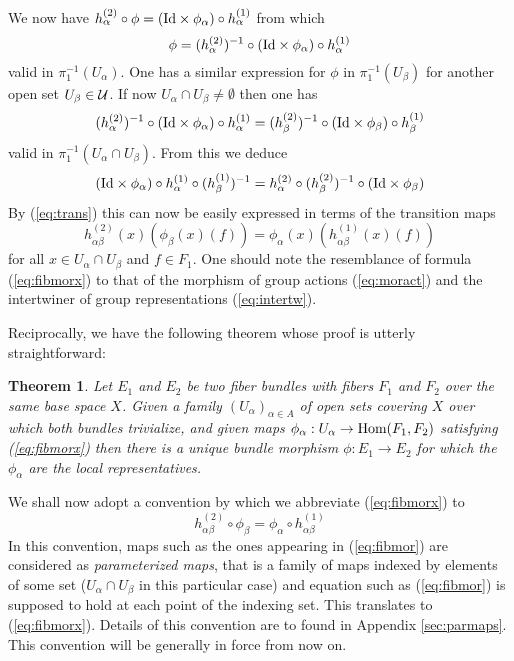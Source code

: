 \documentclass[12pt,titlepage]{article}
\def\cU{{\cal U}}
\def\Hom{\hbox{Hom}}
\def\Id{\hbox{Id}}
\newtheorem{theorem}{Theorem}
\begin{document}
We now have \(h_\alpha^{(2)}\circ \phi= (\Id\times\phi_\alpha)\circ
h_\alpha^{(1)}\) from which 
\[
\phi= (h_\alpha^{(2)})^{-1}\circ(\Id
\times\phi_\alpha)\circ
h_\alpha^{(1)}
\]
 valid in \(\pi_1^{-1}(U_\alpha)\). One has a similar
expression for
\(\phi\) in \(\pi_1^{-1}(U_\beta)\) for another open set \(U_\beta\in\cU\).
If now
\(U_\alpha\cap U_\beta \neq\emptyset\) then one has
\[
(h_\alpha^{(2)})^{-1}\circ(\Id\times\phi_\alpha)\circ
h_\alpha^{(1)} = (h_\beta^{(2)})^{-1}\circ(\Id\times\phi_\beta)\circ
h_\beta^{(1)}
\]
valid in \(\pi_1^{-1}(U_\alpha\cap U_\beta)\). From this we deduce
\[
(\Id\times\phi_\alpha)\circ
h_\alpha^{(1)}\circ (h_\beta^{(1)})^{-1}  = h_\alpha^{(2)}\circ
(h_\beta^{(2)})^{-1}\circ(\Id\times\phi_\beta)
\]
By (\ref{eq:trans}) this can now be easily 
expressed in terms of the transition maps
\begin{equation} \label{eq:fibmorx}
h^{(2)}_{\alpha\beta}(x)(\phi_\beta(x)(f)) = \phi_\alpha(x)(
h^{(1)}_{\alpha\beta}(x)(f))
\end{equation}%
for all \(x\in U_\alpha\cap U_\beta\) and \(f\in F_1\).
One should note the resemblance of formula (\ref{eq:fibmorx}) to that of the
morphism of
group actions (\ref{eq:moract}) and the intertwiner of group
representations (\ref{eq:intertw}).

Reciprocally, we have the following theorem whose proof is utterly
straightforward:
\begin{theorem}\label{th:fiblocmor}
Let \(E_1\) and \(E_2\) be two fiber bundles with fibers
\(F_1\) and \(F_2\) over the same base space \(X\). Given a family 
\((U_\alpha)_{\alpha\in A}\) of open sets covering \(X\) over which both
bundles trivialize, and given maps \(\phi_\alpha: U_\alpha \to
\Hom(F_1,F_2)\)
satisfying (\ref{eq:fibmorx}) then there is a unique bundle morphism
\(\phi:E_1\to E_2\) for which the \(\phi_\alpha\) are the local
representatives. 
\end{theorem}%


We shall now adopt a convention by which we 
abbreviate (\ref{eq:fibmorx}) to
\begin{equation}\label{eq:fibmor}
h^{(2)}_{\alpha\beta}\circ\phi_\beta = \phi_\alpha \circ
h^{(1)}_{\alpha\beta}
\end{equation}%
In this convention, maps such as the ones appearing in (\ref{eq:fibmor})
are considered as {\em parameterized maps\/},
%
 that is a family of maps
indexed by elements of some set (\(U_\alpha\cap U_\beta\) in this
particular case) and equation such as (\ref{eq:fibmor}) is supposed to
hold at each point of the indexing set. This translates to
(\ref{eq:fibmorx}). Details of this convention are to found in 
Appendix \ref{sec:parmaps}. This convention will be generally in 
force from now on.
 
\end{document}
